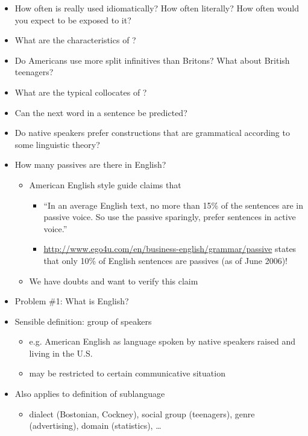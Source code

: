 \documentclass[a4paper,landscape,headrule,footrule,dvips]{foils}
\begin{document}
\begin{CJK}{UTF8}{min}
\begin{itemize}
\item How often is  really used idiomatically?
  How often literally?  How often would you expect to be exposed to
  it?
\item What are the characteristics of ?
\item Do Americans use more split infinitives than
Britons? What about British teenagers?

\item What are the typical collocates of ?
\item Can the next word in a sentence be predicted?
\item Do native speakers prefer constructions that are
grammatical according to some linguistic theory?
\end{itemize}

\begin{itemize}
\item How many passives are there in English?
\begin{itemize}
\item American English style guide claims that
\begin{itemize}
\item “In an average English text, no more than 15\% of the
sentences are in passive voice. So use the passive
sparingly, prefer sentences in active voice.”

\item \url{http://www.ego4u.com/en/business-english/grammar/passive}
states that only 10\% of English sentences are
passives (as of June 2006)!
\end{itemize}
\item We have doubts and want to verify this claim
\end{itemize}
\end{itemize}

\begin{itemize}
\item Problem \#1: What is English?
\item Sensible definition: group of speakers
  \begin{itemize}
  \item e.g. American English as language spoken by
    native speakers raised and living in the U.S.
  \item may be restricted to certain communicative situation
  \end{itemize}
\item Also applies to definition of sublanguage
\begin{itemize}
\item dialect (Bostonian, Cockney), social group (teenagers), genre
  (advertising), domain (statistics), \ldots
\end{itemize}
\end{itemize}


\end{CJK}
\end{document}

